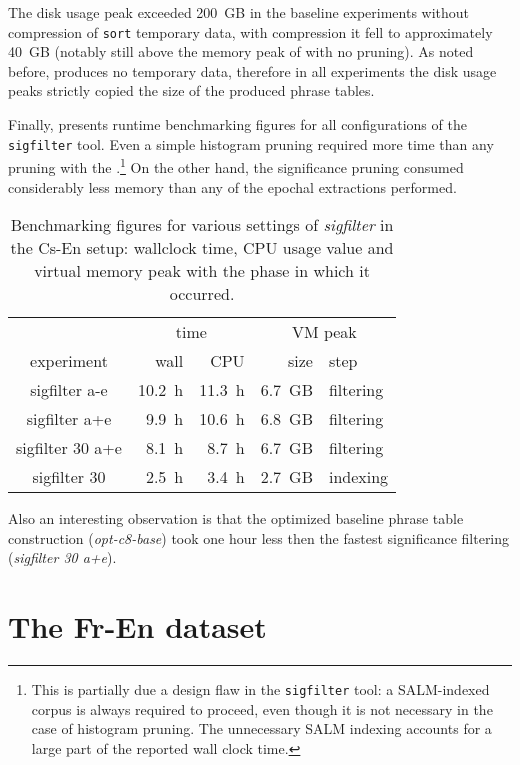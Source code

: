 The disk usage peak exceeded 200~GB in the baseline experiments without compression of
\texttt{sort} temporary data, with compression it fell to approximately 40~GB
(notably still above the memory peak of \eppex{} with no pruning).
As noted before, \eppex{} produces no temporary data, therefore in all experiments the
disk usage peaks strictly copied the size of the produced phrase tables.

Finally,  presents runtime benchmarking
figures for all configurations of the \texttt{sigfilter} tool.
Even a simple histogram pruning required more time than any pruning with the
\eppex{}.\footnote{This is partially due a design flaw in the \texttt{sigfilter} tool:
a SALM-indexed corpus is always required to proceed, even though it is not necessary in
the case of histogram pruning. The unnecessary SALM indexing accounts for a large part
of the reported wall clock time.}
On the other hand, the significance pruning consumed considerably less memory than any
of the epochal extractions performed.

\begin{table}[ht]
\centering
\begin{tabular}{ | c | r r | r l | }
\hline
 & \multicolumn{2}{|c|}{time} & \multicolumn{2}{|c|}{VM peak} \\
experiment & wall & CPU & size & step \\
\hline
\hline
sigfilter a-e     & 10.2~h & 11.3~h & 6.7~GB & filtering \\
sigfilter a+e     & 9.9~h & 10.6~h & 6.8~GB & filtering \\
sigfilter 30 a+e  & 8.1~h & 8.7~h & 6.7~GB & filtering \\
sigfilter 30      & 2.5~h & 3.4~h & 2.7~GB & indexing \\
\hline
\end{tabular}
\caption{\label{cs-en-wmt13-sigfilter-runtime-benchmarks}
Benchmarking figures for various settings of \emph{sigfilter} in the Cs-En setup:
wallclock time, CPU usage value and virtual memory peak with the phase in which it occurred.}
\end{table}

Also an interesting observation is that the optimized baseline phrase table construction
(\emph{opt-c8-base}) took one hour less then the fastest significance filtering
(\emph{sigfilter 30 a+e}).

\section{The Fr-En dataset}
\label{sec:fr-en-results}

